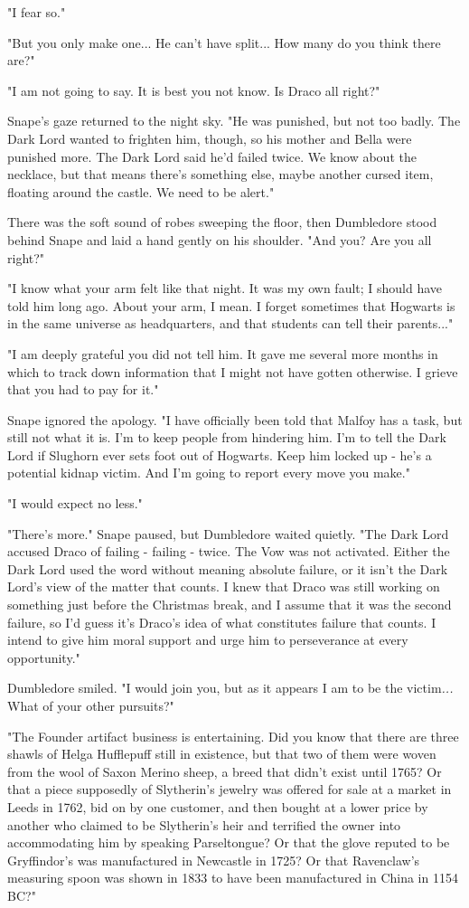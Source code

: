 \documentclass[a4paper,11pt]{article}
\begin{document}
"I fear so."

"But you only make one... He can't have split... How many do you think there are?"

"I am not going to say. It is best you not know. Is Draco all right?"

Snape's gaze returned to the night sky. "He was punished, but not too badly. The Dark Lord wanted to frighten him, though, so his mother and Bella were punished more. The Dark Lord said he'd failed twice. We know about the necklace, but that means there's something else, maybe another cursed item, floating around the castle. We need to be alert."

There was the soft sound of robes sweeping the floor, then Dumbledore stood behind Snape and laid a hand gently on his shoulder. "And you? Are you all right?"

"I know what your arm felt like that night. It was my own fault; I should have told him long ago. About your arm, I mean. I forget sometimes that Hogwarts is in the same universe as headquarters, and that students can tell their parents..."

"I am deeply grateful you did not tell him. It gave me several more months in which to track down information that I might not have gotten otherwise. I grieve that you had to pay for it."

Snape ignored the apology. "I have officially been told that Malfoy has a task, but still not what it is. I'm to keep people from hindering him. I'm to tell the Dark Lord if Slughorn ever sets foot out of Hogwarts. Keep him locked up - he's a potential kidnap victim. And I'm going to report every move you make."

"I would expect no less."

"There's more." Snape paused, but Dumbledore waited quietly. "The Dark Lord accused Draco of failing - failing - twice. The Vow was not activated. Either the Dark Lord used the word without meaning absolute failure, or it isn't the Dark Lord's view of the matter that counts. I knew that Draco was still working on something just before the Christmas break, and I assume that it was the second failure, so I'd guess it's Draco's idea of what constitutes failure that counts. I intend to give him moral support and urge him to perseverance at every opportunity."

Dumbledore smiled. "I would join you, but as it appears I am to be the victim\emph{...} What of your other pursuits?"

"The Founder artifact business is entertaining. Did you know that there are three shawls of Helga Hufflepuff still in existence, but that two of them were woven from the wool of Saxon Merino sheep, a breed that didn't exist until 1765? Or that a piece supposedly of Slytherin's jewelry was offered for sale at a market in Leeds in 1762, bid on by one customer, and then bought at a lower price by another who claimed to be Slytherin's heir and terrified the owner into accommodating him by speaking Parseltongue? Or that the glove reputed to be Gryffindor's was manufactured in Newcastle in 1725? Or that Ravenclaw's measuring spoon was shown in 1833 to have been manufactured in China in 1154 BC?"
\end{document}
